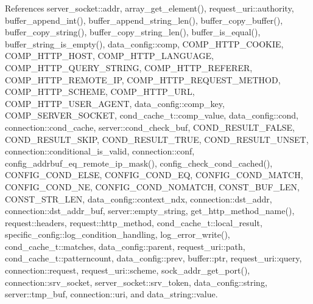 References server\-\_\-socket\-::addr, array\-\_\-get\-\_\-element(), request\-\_\-uri\-::authority, buffer\-\_\-append\-\_\-int(), buffer\-\_\-append\-\_\-string\-\_\-len(), buffer\-\_\-copy\-\_\-buffer(), buffer\-\_\-copy\-\_\-string(), buffer\-\_\-copy\-\_\-string\-\_\-len(), buffer\-\_\-is\-\_\-equal(), buffer\-\_\-string\-\_\-is\-\_\-empty(), data\-\_\-config\-::comp, C\-O\-M\-P\-\_\-\-H\-T\-T\-P\-\_\-\-C\-O\-O\-K\-I\-E, C\-O\-M\-P\-\_\-\-H\-T\-T\-P\-\_\-\-H\-O\-S\-T, C\-O\-M\-P\-\_\-\-H\-T\-T\-P\-\_\-\-L\-A\-N\-G\-U\-A\-G\-E, C\-O\-M\-P\-\_\-\-H\-T\-T\-P\-\_\-\-Q\-U\-E\-R\-Y\-\_\-\-S\-T\-R\-I\-N\-G, C\-O\-M\-P\-\_\-\-H\-T\-T\-P\-\_\-\-R\-E\-F\-E\-R\-E\-R, C\-O\-M\-P\-\_\-\-H\-T\-T\-P\-\_\-\-R\-E\-M\-O\-T\-E\-\_\-\-I\-P, C\-O\-M\-P\-\_\-\-H\-T\-T\-P\-\_\-\-R\-E\-Q\-U\-E\-S\-T\-\_\-\-M\-E\-T\-H\-O\-D, C\-O\-M\-P\-\_\-\-H\-T\-T\-P\-\_\-\-S\-C\-H\-E\-M\-E, C\-O\-M\-P\-\_\-\-H\-T\-T\-P\-\_\-\-U\-R\-L, C\-O\-M\-P\-\_\-\-H\-T\-T\-P\-\_\-\-U\-S\-E\-R\-\_\-\-A\-G\-E\-N\-T, data\-\_\-config\-::comp\-\_\-key, C\-O\-M\-P\-\_\-\-S\-E\-R\-V\-E\-R\-\_\-\-S\-O\-C\-K\-E\-T, cond\-\_\-cache\-\_\-t\-::comp\-\_\-value, data\-\_\-config\-::cond, connection\-::cond\-\_\-cache, server\-::cond\-\_\-check\-\_\-buf, C\-O\-N\-D\-\_\-\-R\-E\-S\-U\-L\-T\-\_\-\-F\-A\-L\-S\-E, C\-O\-N\-D\-\_\-\-R\-E\-S\-U\-L\-T\-\_\-\-S\-K\-I\-P, C\-O\-N\-D\-\_\-\-R\-E\-S\-U\-L\-T\-\_\-\-T\-R\-U\-E, C\-O\-N\-D\-\_\-\-R\-E\-S\-U\-L\-T\-\_\-\-U\-N\-S\-E\-T, connection\-::conditional\-\_\-is\-\_\-valid, connection\-::conf, config\-\_\-addrbuf\-\_\-eq\-\_\-remote\-\_\-ip\-\_\-mask(), config\-\_\-check\-\_\-cond\-\_\-cached(), C\-O\-N\-F\-I\-G\-\_\-\-C\-O\-N\-D\-\_\-\-E\-L\-S\-E, C\-O\-N\-F\-I\-G\-\_\-\-C\-O\-N\-D\-\_\-\-E\-Q, C\-O\-N\-F\-I\-G\-\_\-\-C\-O\-N\-D\-\_\-\-M\-A\-T\-C\-H, C\-O\-N\-F\-I\-G\-\_\-\-C\-O\-N\-D\-\_\-\-N\-E, C\-O\-N\-F\-I\-G\-\_\-\-C\-O\-N\-D\-\_\-\-N\-O\-M\-A\-T\-C\-H, C\-O\-N\-S\-T\-\_\-\-B\-U\-F\-\_\-\-L\-E\-N, C\-O\-N\-S\-T\-\_\-\-S\-T\-R\-\_\-\-L\-E\-N, data\-\_\-config\-::context\-\_\-ndx, connection\-::dst\-\_\-addr, connection\-::dst\-\_\-addr\-\_\-buf, server\-::empty\-\_\-string, get\-\_\-http\-\_\-method\-\_\-name(), request\-::headers, request\-::http\-\_\-method, cond\-\_\-cache\-\_\-t\-::local\-\_\-result, specific\-\_\-config\-::log\-\_\-condition\-\_\-handling, log\-\_\-error\-\_\-write(), cond\-\_\-cache\-\_\-t\-::matches, data\-\_\-config\-::parent, request\-\_\-uri\-::path, cond\-\_\-cache\-\_\-t\-::patterncount, data\-\_\-config\-::prev, buffer\-::ptr, request\-\_\-uri\-::query, connection\-::request, request\-\_\-uri\-::scheme, sock\-\_\-addr\-\_\-get\-\_\-port(), connection\-::srv\-\_\-socket, server\-\_\-socket\-::srv\-\_\-token, data\-\_\-config\-::string, server\-::tmp\-\_\-buf, connection\-::uri, and data\-\_\-string\-::value.



